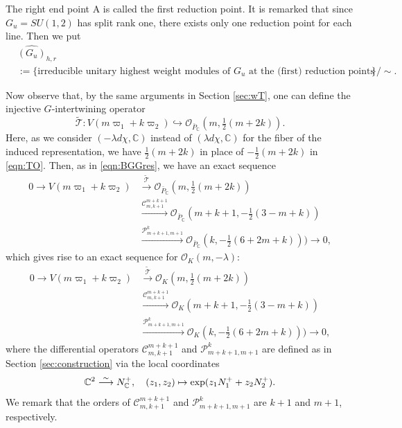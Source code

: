 \documentclass[reqno,11pt]{amsart}
\theoremstyle{remark}
\numberwithin{equation}{section}
\newcommand{\C}{\mathbb{C}}
\newcommand{\Cal}{\mathcal}
\newcommand{\To}{\longrightarrow}
\newcommand{\wT}{\widetilde{\Cal{T}}}
\begin{document}

The right end point A is called the first reduction point.
It is remarked that since $G_u = SU(1,2)$ has split rank one, there exists only one 
reduction point for each line. Then we put
\begin{align*}
&\widehat{(G_u)}_{h,r}\\
&:=
\{\text{irreducible unitary highest weight modules of $G_u$  
at the (first) reduction points}\}/\sim.
\end{align*}

Now observe that, 
by the same arguments in Section \ref{sec:wT},
one can define the injective $G$-intertwining operator
\begin{equation}\label{eqn:TO}
\wT\colon V(m\varpi_1 + k \varpi_2) \hookrightarrow \Cal{O}_{\bar{P}_\C}(m, \tfrac{1}{2}(m+2k)).
\end{equation}
Here, as we consider $(-\lambda d\chi, \C)$ instead of $(\lambda d\chi, \C)$
for the fiber of the induced representation, we have
$\frac{1}{2}(m+2k)$ in place of $-\frac{1}{2}(m+2k)$  in \eqref{eqn:TO}.
Then, as in \eqref{eqn:BGGres}, we have 
an exact sequence
\begin{equation*}
\begin{aligned}
0\To
V(m\varpi_1 + k \varpi_2)
&\stackrel{\wT}{\To}
\Cal{O}_{\bar{P}_\C}(m, \tfrac{1}{2}(m+2k))\\
&\stackrel{\Cal{C}^{m+k+1}_{m,k+1}}{\To}
\Cal{O}_{\bar{P}_\C}(m+k+1, -\tfrac{1}{2}(3-m+k))\\[5pt]
&\stackrel{\Cal{P}^{k}_{m+k+1,m+1}}{\To}
\Cal{O}_{\bar{P}_\C}(k, -\tfrac{1}{2}(6+2m+k)))
\To 0,
\end{aligned}
\end{equation*}
which gives rise to an exact sequence for $\Cal{O}_K(m,-\lambda)$:
\begin{equation}\label{eqn:BGGgeneral3}
\begin{aligned}
0\To
V(m\varpi_1 + k \varpi_2)
&\stackrel{\wT}{\To}
\Cal{O}_{K}(m, \tfrac{1}{2}(m+2k))\\
&\stackrel{\Cal{C}^{m+k+1}_{m,k+1}}{\To}
\Cal{O}_{K}(m+k+1, -\tfrac{1}{2}(3-m+k))\\[5pt]
&\stackrel{\Cal{P}^{k}_{m+k+1,m+1}}{\To}
\Cal{O}_{K}(k, -\tfrac{1}{2}(6+2m+k)))
\To 0,
\end{aligned}
\end{equation}
where the differential operators
$\Cal{C}^{m+k+1}_{m,k+1}$ and $\Cal{P}^{k}_{m+k+1,m+1}$
are defined as in Section \ref{sec:construction} via the local coordinates
\begin{equation}\label{eqn:coord2}
\C^2 
\stackrel{\sim}{\To} N^+_\C, \quad (z_1, z_2) 
\mapsto \exp(z_1 N^+_1 +z_2N^+_2).\\[3pt]
\end{equation}
We remark that the orders of 
$\Cal{C}^{m+k+1}_{m,k+1}$ and $\Cal{P}^{k}_{m+k+1,m+1}$
are $k+1$ and $m+1$, respectively. 
\end{document}
